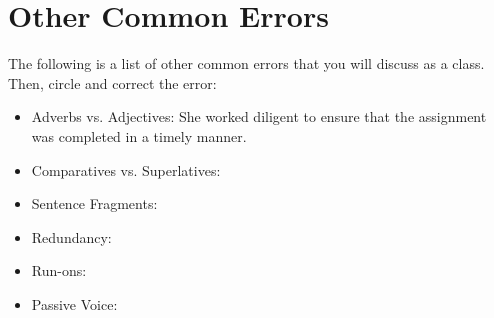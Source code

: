 \section{Other Common Errors}

The following is a list of other common errors that you will discuss as a class. Then, circle and correct the error:
\begin{itemize}
 \item{Adverbs vs. Adjectives:} \hrulefill
 She worked diligent to ensure that the assignment was completed in a timely manner. 
 
\item{Comparatives vs. Superlatives:} \hrulefill
\item{Sentence Fragments:} \hrulefill
\item{Redundancy:} \hrulefill
\item{Run-ons:} \hrulefill
\item{Passive Voice: } \hrulefill

\end{itemize} 